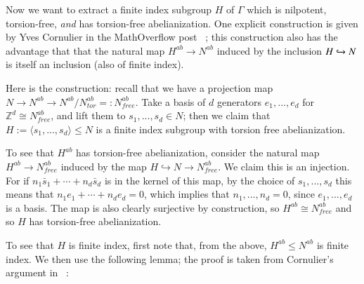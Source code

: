 \documentclass[12pt,reqno]{article}
\numberwithin{equation}{section}
\newcommand{\Z}{\mathbb{Z}}
\begin{document}
Now we want to extract a finite index subgroup $H$ of $\Gamma$ which is nilpotent, torsion-free,
\emph{and} has torsion-free abelianization. One explicit construction is given by Yves Cornulier in the MathOverflow post ~\cite{YCor};
this construction also has the advantage that that the natural map $H^{ab} \to N^{ab}$ induced by the inclusion $H \xhookrightarrow{} N$
is itself an inclusion (also of finite index).

Here is the construction: recall that we have a projection map $N \to N^{ab} \to N^{ab}/N^{ab}_{tor} =: N^{ab}_{free}$.
Take a basis of $d$ generators $e_1,...,e_d$ for $\Z^d \cong N^{ab}_{free}$, and lift them to $s_1,...,s_d \in N$; then we claim that
$H:= \langle s_1,...,s_d \rangle \le N$ is a finite index subgroup with torsion free abelianization. 

To see that $H^{ab}$ has torsion-free abelianization, consider the natural map $H^{ab} \to N^{ab}_{free}$ induced by the map 
$H \hookrightarrow{} N \to N^{ab}_{free}$.
We claim this is an injection. For if $n_1 \bar{s}_1 + \cdots + n_d \bar{s}_d$ is in the kernel of this map, by the choice of $s_1,...,s_d$ this
means that $n_1 e_1 + \cdots + n_d e_d = 0$, which implies that $n_1,...,n_d=0$, since $e_1,...,e_d$ is a basis.
The map is also clearly surjective by construction, so $H^{ab} \cong N^{ab}_{free}$ and so $H$ has torsion-free abelianization.

To see that $H$ is finite index, first note that, from the above, $H^{ab} \le N^{ab}$ is finite index. We then use the following lemma; the proof
is taken from Cornulier's argument in ~\cite{YCor}:
\end{document}
